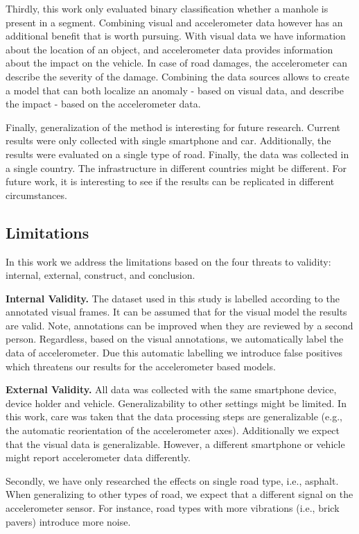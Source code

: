 Thirdly, this work only evaluated binary classification whether a manhole is present in a segment. Combining visual and accelerometer data however has an additional benefit that is worth pursuing. With visual data we have information about the location of an object, and accelerometer data provides information about the impact on the vehicle. In case of road damages, the accelerometer can describe the severity of the damage. Combining the data sources allows to create a model that can both localize an anomaly - based on visual data, and describe the impact - based on the accelerometer data. 

Finally, generalization of the method is interesting for future research. Current results were only collected with single smartphone and car. Additionally, the results were evaluated on a single type of road. Finally, the data was collected in a single country. The infrastructure in different countries might be different. For future work, it is interesting to see if the results can be replicated in different circumstances.


\subsection{Limitations}

In this work we address the limitations based on the four threats to validity: internal, external, construct, and conclusion. 

\textbf{Internal Validity.} The dataset used in this study is labelled according to the annotated visual frames. It can be assumed that for the visual model the results are valid. Note, annotations can be improved when they are reviewed by a second person. Regardless, based on the visual annotations, we automatically label the data of accelerometer. Due this automatic labelling we introduce false positives which threatens our results for the accelerometer based models.

\textbf{External Validity.} All data was collected with the same smartphone device, device holder and vehicle. Generalizability to other settings might be limited. In this work, care was taken that the data processing steps are generalizable (e.g., the automatic reorientation of the accelerometer axes). Additionally we  expect that the visual data is generalizable. However, a different smartphone or vehicle might report accelerometer data differently.

Secondly, we have only researched the effects on single road type, i.e., asphalt. When generalizing to other types of road, we expect that a different signal on the accelerometer sensor. For instance, road types with more vibrations (i.e., brick pavers) introduce more noise.


